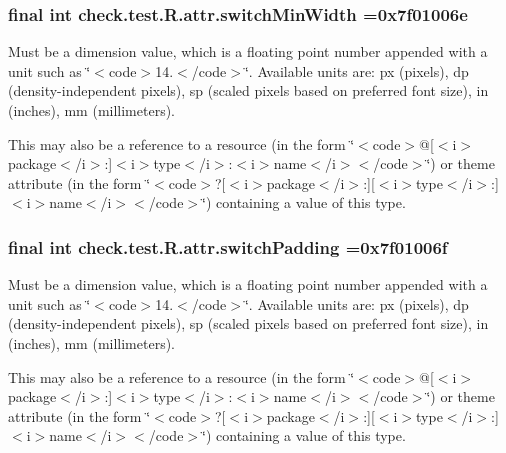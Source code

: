 \subsubsection[{switch\+Min\+Width}]{\setlength{\rightskip}{0pt plus 5cm}final int check.\+test.\+R.\+attr.\+switch\+Min\+Width =0x7f01006e\hspace{0.3cm}{\ttfamily [static]}}\label{classcheck_1_1test_1_1_r_1_1attr_aab06ab49d50f5d3f49bf75148054587f}
Must be a dimension value, which is a floating point number appended with a unit such as \char`\"{}$<$code$>$14.\+5sp$<$/code$>$\char`\"{}. Available units are\+: px (pixels), dp (density-\/independent pixels), sp (scaled pixels based on preferred font size), in (inches), mm (millimeters). 

This may also be a reference to a resource (in the form \char`\"{}$<$code$>$@\mbox{[}$<$i$>$package$<$/i$>$\+:\mbox{]}$<$i$>$type$<$/i$>$\+:$<$i$>$name$<$/i$>$$<$/code$>$\char`\"{}) or theme attribute (in the form \char`\"{}$<$code$>$?\mbox{[}$<$i$>$package$<$/i$>$\+:\mbox{]}\mbox{[}$<$i$>$type$<$/i$>$\+:\mbox{]}$<$i$>$name$<$/i$>$$<$/code$>$\char`\"{}) containing a value of this type. \hypertarget{classcheck_1_1test_1_1_r_1_1attr_a142f39b9fb3ad458745e991e3a049d97}{}
\subsubsection[{switch\+Padding}]{\setlength{\rightskip}{0pt plus 5cm}final int check.\+test.\+R.\+attr.\+switch\+Padding =0x7f01006f\hspace{0.3cm}{\ttfamily [static]}}\label{classcheck_1_1test_1_1_r_1_1attr_a142f39b9fb3ad458745e991e3a049d97}
Must be a dimension value, which is a floating point number appended with a unit such as \char`\"{}$<$code$>$14.\+5sp$<$/code$>$\char`\"{}. Available units are\+: px (pixels), dp (density-\/independent pixels), sp (scaled pixels based on preferred font size), in (inches), mm (millimeters). 

This may also be a reference to a resource (in the form \char`\"{}$<$code$>$@\mbox{[}$<$i$>$package$<$/i$>$\+:\mbox{]}$<$i$>$type$<$/i$>$\+:$<$i$>$name$<$/i$>$$<$/code$>$\char`\"{}) or theme attribute (in the form \char`\"{}$<$code$>$?\mbox{[}$<$i$>$package$<$/i$>$\+:\mbox{]}\mbox{[}$<$i$>$type$<$/i$>$\+:\mbox{]}$<$i$>$name$<$/i$>$$<$/code$>$\char`\"{}) containing a value of this type. \hypertarget{classcheck_1_1test_1_1_r_1_1attr_a9ae7872d556d50683fe08cd498d71991}{}
